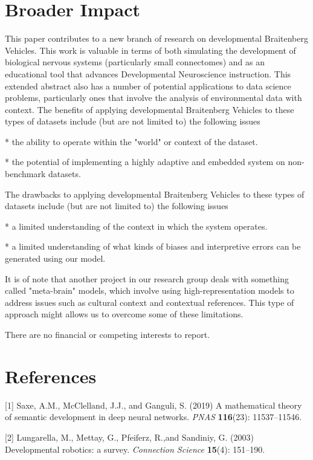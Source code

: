 \documentclass{article}
\begin{document}
\section*{Broader Impact}
This paper contributes to a new branch of research on developmental Braitenberg Vehicles. This work is valuable in terms of both simulating the development of biological nervous systems (particularly small connectomes) and as an educational tool that advances Developmental Neuroscience instruction. This extended abstract also has a number of potential applications to data science problems, particularly ones that involve the analysis of environmental data with context. The benefits of applying developmental Braitenberg Vehicles to these types of datasets include (but are not limited to) the following issues

* the ability to operate within the "world" or context of the dataset.

* the potential of implementing a highly adaptive and embedded system on non-benchmark datasets.

The drawbacks to applying developmental Braitenberg Vehicles to these types of datasets include (but are not limited to) the following issues

* a limited understanding of the context in which the system operates.

* a limited understanding of what kinds of biases and interpretive errors can be generated using our model.

It is of note that another project in our research group deals with something called "meta-brain" models, which involve using high-representation models to address issues such as cultural context and contextual references. This type of approach might allows us to overcome some of these limitations.

\begin{ack}
There are no financial or competing interests to report.
\end{ack}

\section*{References}
\medskip
\small
[1] Saxe, A.M., McClelland, J.J., and Ganguli, S. (2019) A mathematical theory of semantic development in deep neural networks. {\it PNAS} {\bf 116}(23): 11537–11546.

[2] Lungarella, M., Mettay, G., Pfeiferz, R.,and Sandiniy, G. (2003) Developmental robotics: a survey. {\it Connection Science} {\bf 15}(4): 151–190.
\end{document}
